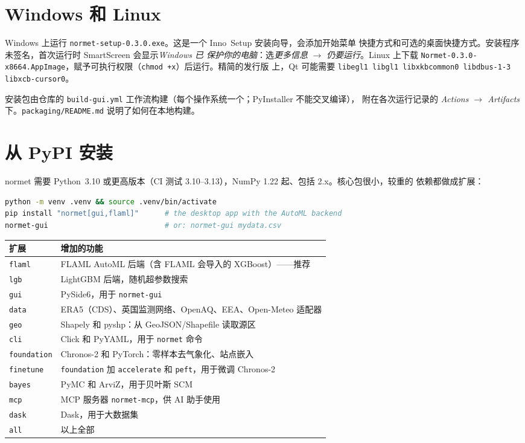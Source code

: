 \documentclass[11pt]{ctexrep}
\newcommand{\nm}{\textsf{normet}}
\newcommand{\codeunderscore}{\textunderscore\allowbreak}
\newcommand{\code}[1]{\texttt{\let\_\codeunderscore #1}}
\begin{document}
\section{Windows 和 Linux}
Windows 上运行 \code{normet-setup-0.3.0.exe}。这是一个 Inno~Setup 安装向导，会添加开始菜单
快捷方式和可选的桌面快捷方式。安装程序未签名，首次运行时 SmartScreen 会显示\emph{Windows 已
保护你的电脑}：选\emph{更多信息} $\rightarrow$ \emph{仍要运行}。Linux 上下载
\code{Normet-0.3.0-x86\_64.AppImage}，赋予可执行权限（\code{chmod +x}）后运行。精简的发行版
上，Qt 可能需要 \code{libegl1 libgl1 libxkbcommon0 libdbus-1-3 libxcb-cursor0}。

安装包由仓库的 \code{build-gui.yml} 工作流构建（每个操作系统一个；PyInstaller 不能交叉编译），
附在各次运行记录的 \emph{Actions $\rightarrow$ Artifacts} 下。\code{packaging/README.md}
说明了如何在本地构建。

\section{从 PyPI 安装}
\nm{} 需要 Python~3.10 或更高版本（CI 测试 3.10--3.13），NumPy 1.22 起、包括 2.x。核心包很小，较重的
依赖都做成扩展：
\begin{lstlisting}[language=bash]
python -m venv .venv && source .venv/bin/activate
pip install "normet[gui,flaml]"      # the desktop app with the AutoML backend
normet-gui                           # or: normet-gui mydata.csv
\end{lstlisting}

\begin{center}\small
\begin{tabular}{@{}ll@{}}
\toprule
扩展 & 增加的功能 \\
\midrule
\code{flaml}      & FLAML AutoML 后端（含 FLAML 会导入的 XGBoost）——推荐 \\
\code{lgb}        & LightGBM 后端，随机超参数搜索 \\
\code{gui}        & PySide6，用于 \code{normet-gui} \\
\code{data}       & ERA5（CDS）、英国监测网络、OpenAQ、EEA、Open-Meteo 适配器 \\
\code{geo}        & Shapely 和 pyshp：从 GeoJSON/Shapefile 读取源区 \\
\code{cli}        & Click 和 PyYAML，用于 \code{normet} 命令 \\
\code{foundation} & Chronos-2 和 PyTorch：零样本去气象化、站点嵌入 \\
\code{finetune}   & \code{foundation} 加 \code{accelerate} 和 \code{peft}，用于微调 Chronos-2 \\
\code{bayes}      & PyMC 和 ArviZ，用于贝叶斯 SCM \\
\code{mcp}        & MCP 服务器 \code{normet-mcp}，供 AI 助手使用 \\
\code{dask}       & Dask，用于大数据集 \\
\code{all}        & 以上全部 \\
\bottomrule
\end{tabular}
\end{center}
\end{document}
